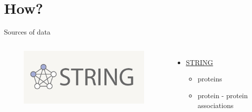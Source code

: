 \documentclass{beamer}
\begin{document}
\section{How?}
\begin{frame}{Sources of data}
\begin{columns}[c] %

\begin{figure}
    \centering
    \includegraphics[width=1\linewidth]{string_logo.png}
\end{figure}
\begin{itemize}
    \item \href{https://string-db.org/}{STRING}
    \begin{itemize}
        \item proteins
        \item protein - protein associations
    \end{itemize}
\end{itemize}


\end{columns}
\end{frame}
\end{document}
